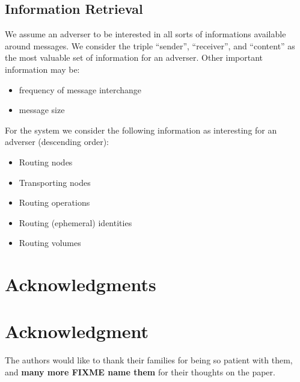 \documentclass[9pt,journal,compsoc]{IEEEtran}
\begin{document}
\subsection{Information Retrieval}
We assume an adverser to be interested in all sorts of informations available around messages. We consider the triple ``sender'', ``receiver'', and ``content'' as the most valuable set of information for an adverser. Other important information may be:

\begin{itemize}
	\item frequency of message interchange
	\item message size
\end{itemize}

For the system we consider the following information as interesting for an adverser (descending order):
\begin{itemize}
	\item Routing nodes
	\item Transporting nodes
	\item Routing operations
	\item Routing (ephemeral) identities
	\item Routing volumes
\end{itemize}



\ifCLASSOPTIONcompsoc
  \section*{Acknowledgments}
\else
  \section*{Acknowledgment}
\fi


The authors would like to thank their families for being so patient with them, and \textbf{many more FIXME name them} for their thoughts on the paper.


\ifCLASSOPTIONcaptionsoff
  \newpage
\fi



\end{document}
